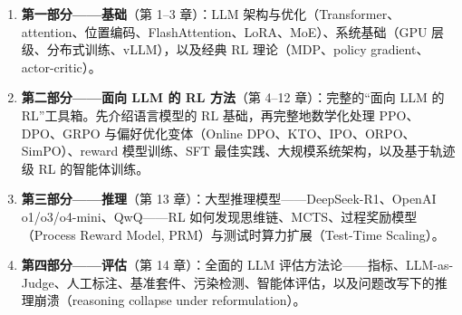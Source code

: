\documentclass[11pt,a4paper,openany]{book}
\begin{document}
\begin{enumerate}
  \item \textbf{第一部分——基础}（第 1--3 章）：LLM 架构与优化（Transformer、attention、位置编码、FlashAttention、LoRA、MoE）、系统基础（GPU 层级、分布式训练、vLLM），以及经典 RL 理论（MDP、policy gradient、actor-critic）。
  \item \textbf{第二部分——面向 LLM 的 RL 方法}（第 4--12 章）：完整的“面向 LLM 的 RL”工具箱。先介绍语言模型的 RL 基础，再完整地数学化处理 PPO、DPO、GRPO 与偏好优化变体（Online DPO、KTO、IPO、ORPO、SimPO）、reward 模型训练、SFT 最佳实践、大规模系统架构，以及基于轨迹级 RL 的智能体训练。
  \item \textbf{第三部分——推理}（第 13 章）：大型推理模型——DeepSeek-R1、OpenAI o1/o3/o4-mini、QwQ——RL 如何发现思维链、MCTS、过程奖励模型（Process Reward Model, PRM）与测试时算力扩展（Test-Time Scaling）。
  \item \textbf{第四部分——评估}（第 14 章）：全面的 LLM 评估方法论——指标、LLM-as-Judge、人工标注、基准套件、污染检测、智能体评估，以及问题改写下的推理崩溃（reasoning collapse under reformulation）。

\end{enumerate}
\end{document}
